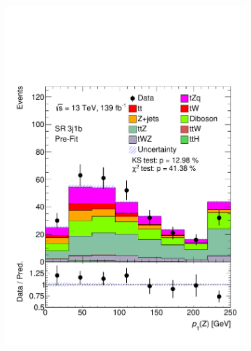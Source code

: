 \begin{figure}[h!]
\begin{subfigure}[b]{0.33\linewidth}
    \includegraphics[width=\linewidth]{ubonn-thesis/Chapters/Chapters_05/Figure/SR/SR_3j1b_Z_pt.pdf} 
  \end{subfigure}%
  \begin{subfigure}[b]{0.33\linewidth}
    \centering

\end{subfigure}
\end{figure}
